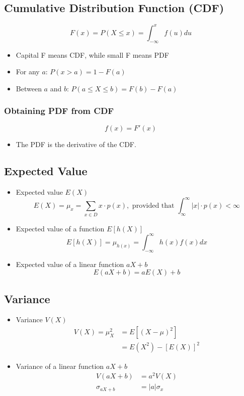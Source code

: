 \documentclass[a4paper]{article}
\begin{document}
\subsection{Cumulative Distribution Function (CDF)}
$$F(x) = P(X\leq x) = \int_{-\infty}^{x}f(u) du
$$
\begin{itemize}
    \item Capital F means CDF, while small F means PDF
    \item For any $a$: $P(x>a) = 1-F(a)$
    \item Between $a$ and $b$: $P(a\leq X\leq b) = F(b) - F(a)$
\end{itemize}
\subsubsection{Obtaining PDF from CDF}
$$f(x) = F'(x)$$
\begin{itemize}
    \item The PDF is the derivative of the CDF.
\end{itemize}
\subsection{Expected Value}
\begin{itemize}
    \item Expected value $E(X)$
    $$E(X) = \mu_{x} = \sum_{x\in D}x\cdot p(x), \text{ provided that }\int_{\infty}^{\infty}|x|\cdot p(x) < \infty
    $$
    \item Expected value of a function $E[h(X)]$
    $$E[h(X)] = \mu_{h(x)} = \int_{-\infty}^{\infty}h(x)f(x) dx
    $$
    \item Expected value of a linear function $aX + b$
    $$E(aX+b) = aE(X) + b
    $$
\end{itemize}
\subsection{Variance}
\begin{itemize}
    \item Variance $V(X)$
    \begin{align*}
        V(X) = \mu_{X}^2 &= E[(X-\mu)^2]\\
        &= E(X^2)-[E(X)]^2
    \end{align*}
    \item Variance of a linear function $aX + b$
    \begin{align*}
        V(aX + b) &= a^{2}V(X)\\
        \sigma_{aX+b} &= |a|\sigma_{x}
    \end{align*}
\end{itemize}
\end{document}
